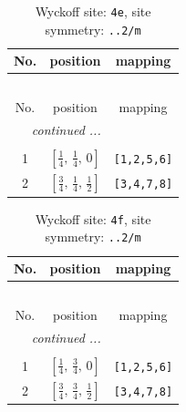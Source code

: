 \documentclass[fleqn,8pt]{jsarticle}
\begin{document}
\begin{longtable}{ccc}
\caption{Wyckoff site: {\tt 4e}, site symmetry: {\tt ..2/m}}
 \\
 \hline \hline
No. & position & mapping \\ \hline \endfirsthead

\multicolumn{2}{l}{\tablename\ \thetable{}} \\
 \hline \hline
No. & position & mapping \\ \hline \endhead

 \hline \hline
\multicolumn{2}{r}{\footnotesize\it continued ...} \\ \endfoot

 \hline \hline
\multicolumn{2}{r}{} \\ \endlastfoot

1 & $\left[ \frac{1}{4},\, \frac{1}{4},\, 0 \right]$ & {\tt [1,2,5,6]} \\ \hline
2 & $\left[ \frac{3}{4},\, \frac{1}{4},\, \frac{1}{2} \right]$ & {\tt [3,4,7,8]} \\
\end{longtable}
\renewcommand{\arraystretch}{1.2}
\begin{longtable}{ccc}
\caption{Wyckoff site: {\tt 4f}, site symmetry: {\tt ..2/m}}
 \\
 \hline \hline
No. & position & mapping \\ \hline \endfirsthead

\multicolumn{2}{l}{\tablename\ \thetable{}} \\
 \hline \hline
No. & position & mapping \\ \hline \endhead

 \hline \hline
\multicolumn{2}{r}{\footnotesize\it continued ...} \\ \endfoot

 \hline \hline
\multicolumn{2}{r}{} \\ \endlastfoot

1 & $\left[ \frac{1}{4},\, \frac{3}{4},\, 0 \right]$ & {\tt [1,2,5,6]} \\ \hline
2 & $\left[ \frac{3}{4},\, \frac{3}{4},\, \frac{1}{2} \right]$ & {\tt [3,4,7,8]} \\
\end{longtable}
\renewcommand{\arraystretch}{1.2}
\end{document}
